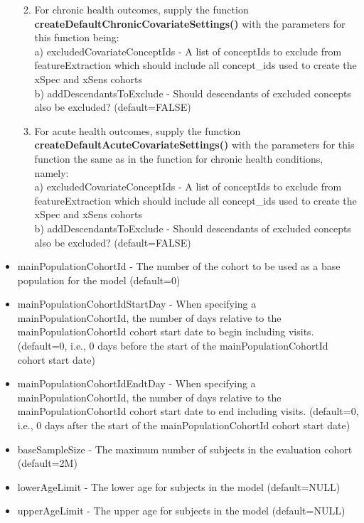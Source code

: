 \documentclass[
]{article}
\providecommand{\tightlist}{%
  \setlength{\itemsep}{0pt}\setlength{\parskip}{0pt}}
\begin{document}
\begin{itemize}
  \begin{enumerate}
  \def\labelenumi{\arabic{enumi})}
  \tightlist
  \item
    For chronic health outcomes, supply the function
    \textbf{createDefaultChronicCovariateSettings()} with the parameters
    for this function being:\\
    a) excludedCovariateConceptIds - A list of conceptIds to exclude
    from featureExtraction which should include all concept\_ids used to
    create the xSpec and xSens cohorts\\
    b) addDescendantsToExclude - Should descendants of excluded concepts
    also be excluded? (default=FALSE)\\
  \item
    For acute health outcomes, supply the function
    \textbf{createDefaultAcuteCovariateSettings()} with the parameters
    for this function the same as in the function for chronic health
    conditions, namely:\\
    a) excludedCovariateConceptIds - A list of conceptIds to exclude
    from featureExtraction which should include all concept\_ids used to
    create the xSpec and xSens cohorts\\
    b) addDescendantsToExclude - Should descendants of excluded concepts
    also be excluded? (default=FALSE)\\
  \end{enumerate}
\item
  mainPopulationCohortId - The number of the cohort to be used as a base
  population for the model (default=0)
\item
  mainPopulationCohortIdStartDay - When specifying a
  mainPopulationCohortId, the number of days relative to the
  mainPopulationCohortId cohort start date to begin including visits.
  (default=0, i.e., 0 days before the start of the
  mainPopulationCohortId cohort start date)
\item
  mainPopulationCohortIdEndtDay - When specifying a
  mainPopulationCohortId, the number of days relative to the
  mainPopulationCohortId cohort start date to end including visits.
  (default=0, i.e., 0 days after the start of the mainPopulationCohortId
  cohort start date)
\item
  baseSampleSize - The maximum number of subjects in the evaluation
  cohort (default=2M)
\item
  lowerAgeLimit - The lower age for subjects in the model (default=NULL)
\item
  upperAgeLimit - The upper age for subjects in the model (default=NULL)

\end{itemize}
\end{document}

